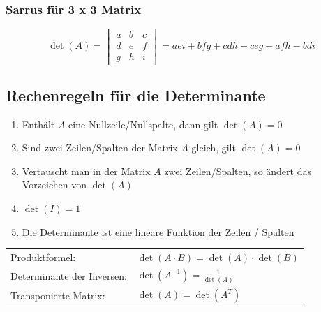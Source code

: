 \subsubsection{Sarrus für 3 x 3 Matrix}

\vspace{-0.2cm}
$$\det(A) = 
	\begin{vmatrix}
		a & b &c \\
		d & e & f\\
		g & h & i
	\end{vmatrix} 
= aei + bfg + cdh - ceg - afh - bdi$$


\subsection{Rechenregeln für die Determinante}

\begin{enumerate}
	\item Enthält $A$ eine Nullzeile/Nullspalte, dann gilt $\det(A) = 0$
	\item Sind zwei Zeilen/Spalten der Matrix $A$ gleich, gilt $\det(A) = 0$
	\item Vertauscht man in der Matrix $A$ zwei Zeilen/Spalten, 
			so ändert das Vorzeichen von $\det(A)$
	\item $\det(I) = 1$
	\item Die Determinante ist eine lineare Funktion der Zeilen / Spalten
\end{enumerate}

\vspace{0.2cm}
\renewcommand{\arraystretch}{1.6}
\begin{tabular}{ll}
	Produktformel: 				& $\det(A \cdot B) = \det(A) \cdot \det(B)$ \\
	Determinante der Inversen: 	& $\det(A^{-1}) = \frac{1}{\det(A)}$ \\
	Transponierte Matrix: 		& $\det(A) = \det(A^T)$ \\
\end{tabular}
\renewcommand{\arraystretch}{1}


